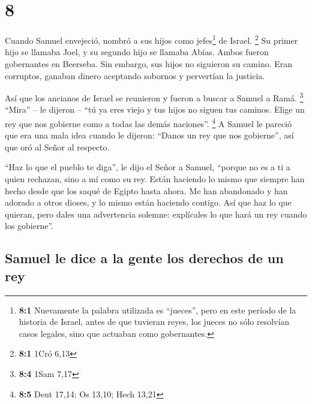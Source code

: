 \hypertarget{section-7}{%
\section{8}\label{section-7}}

 Cuando Samuel envejeció, nombró a sus hijos como
jefes\footnote{\textbf{8:1} Nuevamente la palabra utilizada es
  ``jueces'', pero en este período de la historia de Israel, antes de
  que tuvieran reyes, los jueces no sólo resolvían casos legales, sino
  que actuaban como gobernantes.} de Israel. \footnote{\textbf{8:1} 1Cró
  6,13}  Su primer hijo se llamaba Joel, y su segundo hijo
se llamaba Abías. Ambos fueron gobernantes en Beerseba. 
Sin embargo, sus hijos no siguieron su camino. Eran corruptos, ganaban
dinero aceptando sobornos y pervertían la justicia.

 Así que los ancianos de Israel se reunieron y fueron a
buscar a Samuel a Ramá. \footnote{\textbf{8:4} 1Sam 7,17} 
``Mira'' -- le dijeron -- ``tú ya eres viejo y tus hijos no siguen tus
caminos. Elige un rey que nos gobierne como a todas las demás
naciones''. \footnote{\textbf{8:5} Deut 17,14; Os 13,10; Hech 13,21}
 A Samuel le pareció que era una mala idea cuando le
dijeron: ``Danos un rey que nos gobierne'', así que oró al Señor al
respecto.

 ``Haz lo que el pueblo te diga'', le dijo el Señor a
Samuel, ``porque no es a ti a quien rechazan, sino a mí como su rey.
 Están haciendo lo mismo que siempre han hecho desde que
los saqué de Egipto hasta ahora. Me han abandonado y han adorado a otros
dioses, y lo mismo están haciendo contigo.  Así que haz lo
que quieran, pero dales una advertencia solemne: explícales lo que hará
un rey cuando los gobierne''.

\hypertarget{samuel-le-dice-a-la-gente-los-derechos-de-un-rey}{%
\subsection{Samuel le dice a la gente los derechos de un
rey}\label{samuel-le-dice-a-la-gente-los-derechos-de-un-rey}}

